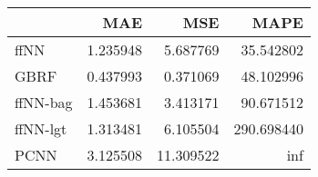 \begin{tabular}{lrrr}
\toprule
{} &       MAE &        MSE &        MAPE \\
\midrule
ffNN     &  1.235948 &   5.687769 &   35.542802 \\
GBRF     &  0.437993 &   0.371069 &   48.102996 \\
ffNN-bag &  1.453681 &   3.413171 &   90.671512 \\
ffNN-lgt &  1.313481 &   6.105504 &  290.698440 \\
PCNN     &  3.125508 &  11.309522 &         inf \\
\bottomrule
\end{tabular}
